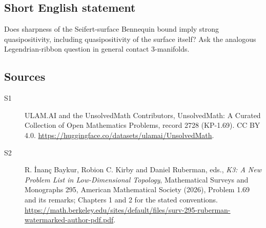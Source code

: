 \documentclass[11pt]{article}
\begin{document}
\subsection{Short English statement}
Does sharpness of the Seifert-surface Bennequin bound imply strong quasipositivity, including quasipositivity of the surface itself? Ask the analogous Legendrian-ribbon question in general contact 3-manifolds.
\subsection{Sources}
\begin{description}
\item[\hypertarget{source:2728:1}{S1}] ULAM.AI and the UnsolvedMath Contributors, UnsolvedMath: A Curated Collection of Open Mathematics Problems, record 2728 (KP-1.69). CC BY 4.0. \url{https://huggingface.co/datasets/ulamai/UnsolvedMath}.
\item[\hypertarget{source:2728:2}{S2}] R. İnanç Baykur, Robion C. Kirby and Daniel Ruberman, eds., \emph{K3: A New Problem List in Low-Dimensional Topology}, Mathematical Surveys and Monographs 295, American Mathematical Society (2026), Problem 1.69 and its remarks; Chapters 1 and 2 for the stated conventions. \url{https://math.berkeley.edu/sites/default/files/surv-295-ruberman-watermarked-author-pdf.pdf}.
\end{description}
\label{end:2728}
\end{document}
